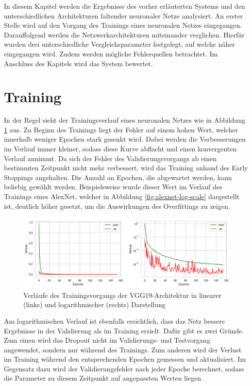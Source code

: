 In diesem Kapitel werden die Ergebnisse des vorher erläuterten Systems und den unterschiedlichen Architekturen faltender neuronaler Netze analysiert. An erster Stelle wird auf den Vorgang des Trainings eines neuronalen Netzes eingegangen. Darauffolgend werden die Netzwerkarchitekturen miteinander verglichen. Hierfür wurden drei unterschiedliche Vergleichsparameter festgelegt, auf welche näher eingegangen wird. Zudem werden mögliche Fehlerquellen betrachtet. Im Anschluss des Kapitels wird das System bewertet.


\section{Training}\label{sec:?}
In der Regel sieht der Trainingsverlauf eines neuronalen Netzes wie in Abbildung \ref{fig:vgg-verlaeufe} aus. Zu Beginn des Trainings liegt der Fehler auf einem hohen Wert, welcher innerhalb weniger Epochen stark gesenkt wird. Dabei werden die Verbesserungen im Verlauf immer kleiner, sodass diese Kurve abflacht und einen konvergenten Verlauf annimmt. Da sich der Fehler des Validierungsvorgangs ab einen bestimmten Zeitpunkt nicht mehr verbessert, wird das Training anhand des Early Stoppings angehalten. Die Anzahl an Epochen, die abgewartet werden, kann beliebig gewählt werden. Beispielsweise wurde dieser Wert im Verlauf des Trainings eines AlexNet, welcher in Abbildung \ref{fig:alexnet-log-scale} dargestellt ist, deutlich höher gesetzt, um die Auswirkungen des Overfittings zu zeigen. 

\begin{figure}[h!]
\centering
\includegraphics[width=16cm]{98_images/normal_log_vgg.png}
\caption{Verläufe des Trainingsvorgangs der VGG19-Architektur in linearer (links) und logarithmischer (rechts) Darstellung}
\label{fig:vgg-verlaeufe}
\end{figure}

\mypar Am logarithmischen Verlauf ist ebenfalls ersichtlich, dass das Netz bessere Ergebnisse in der Validierung als im Training erzielt. Dafür gibt es zwei Gründe. Zum einen wird das Dropout nicht im Validierungs- und Testvorgang angewendet, sondern nur während des Trainings. Zum anderen wird der Verlust im Training während den entsprechenden Epochen gemessen und aktualisiert. Im Gegensatz dazu wird der Validierungsfehler nach jeder Epoche berechnet, sodass die Parameter zu diesem Zeitpunkt auf angepassten Werten liegen.

